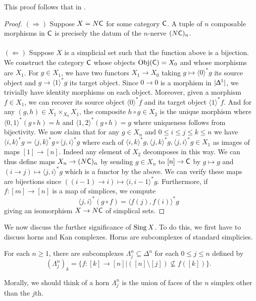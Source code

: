 This proof follows that in \cite[Proposition 1.4.8]{Rezk}.
\begin{proof}
  $(\Longrightarrow)$ Suppose $X=N\mathsf{C}$ for some category $\mathsf{C}$. A tuple of $n$ composable morphisms in $\mathsf{C}$ is precisely the datum of the $n$-nerve $(N\mathsf{C})_{n}$. 
  \\\\
  $(\Longleftarrow)$ Suppose $X$ is a simplicial set such that the function above is a bijection. We construct the category $\mathsf{C}$ whose objects $\mathrm{Obj}(\mathsf{C})=X_{0}$ and whose morphisms are $X_{1}$. For $g\in X_{1}$, we have two functors $X_{1}\to X_{0}$ taking $g\mapsto\langle0\rangle^{*}g$ its source object and $g\to\langle1\rangle^{*}g$ its target object. Since $0\to0$ is a morphism in $|\Updelta^{1}|$, we trivially have identity morphisms on each object. Moreover, given a morphism $f\in X_{1}$, we can recover its source object $\langle0\rangle^{*}f$ and its target object $\langle1\rangle^{*}f$. And for any $(g,h)\in X_{1}\times_{X_{0}}X_{1}$, the composite $h\circ g\in X_{2}$ is the unique morphism where $\langle0,1\rangle^{*}(g\circ h)=h$ and $\langle 1,2\rangle^{*}(g\circ h)=g$ where uniqueness follows from bijectivity. We now claim that for any $g\in X_{n}$ and $0\leq i\leq j\leq k\leq n$ we have $\langle i,k\rangle^{*}g=\langle j,k\rangle^{*}g\circ\langle j,i\rangle^{*}g$ where each of $\langle i,k\rangle^{*}g,\langle j,k\rangle^{*}g,\langle j,i\rangle^{*}g\in X_{1}$ as images of maps $[1]\to[n]$. Indeed any element of $X_{2}$ decomposes in this way. We can thus define maps $X_{n}\to (N\mathsf{C})_{n}$ by sending $g\in X_{n}$ to $[n]\to\mathsf{C}$ by $g\mapsto g$ and $(i\to j)\mapsto \langle j, i\rangle^{*}g$ which is a functor by the above. We can verify these maps are bijections since $((i-1)\to i)\mapsto\langle i, i-1\rangle^{*}g$. Furthermore, if $f:[m]\to [n]$ is a map of simplices, we compute
  $$\langle j,i\rangle^{*}(g\circ f) = \langle f(j), f(i)\rangle^{*}g$$
  giving an isomorphism $X\to N\mathsf{C}$ of simplical sets. 
\end{proof}
We now discuss the further significance of $\operatorname{Sing} X$. To do this, we first have to discuss horns and Kan complexes. Horns are subcomplexes of standard simplicies. 
\begin{definition}[Horn]
  For each $n\geq1$, there are subcomplexes $\Lambda_{j}^{n}\subseteq\Delta^{n}$ for each $0\leq j\leq n$ defined by 
  $$(\Lambda_{j}^{n})_{k}=\{f:[k]\to[n]|([n]\setminus[j])\not\subseteq f([k])\}.$$
\end{definition}
Morally, we should think of a horn $\Lambda^{n}_{j}$ is the union of faces of the $n$ simplex other than the $j$th. 
